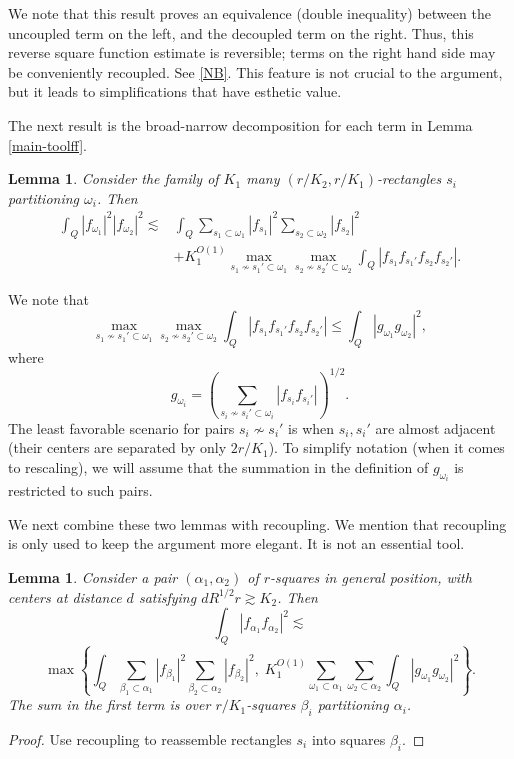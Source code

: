 \documentclass{amsart}%
\numberwithin{equation}{section}
\newtheorem{lemma}[theorem]{Lemma}
\newcommand{\1}{\mathbbm{1}}
\begin{document}
	We note that this result proves an equivalence (double inequality) between the  uncoupled term on the left, and the decoupled term on the right. Thus, this reverse square function estimate is reversible; terms on the right hand side  may be conveniently recoupled. See \eqref{NB}. This feature is not crucial to the argument, but it leads to simplifications that have esthetic value. 
	
	The next result is the broad-narrow decomposition for each term in Lemma \ref{main-toolff}.
	\begin{lemma}
		Consider the family of $K_1$ many  $(r/K_2,r/K_1)$-rectangles $s_i$ partitioning  $\omega_i$. Then 
		\begin{align*}
			\int_Q|f_{\omega_1}|^2|f_{\omega_2}|^2\lesssim &\int_Q\sum_{s_1\subset \omega_1}|f_{s_1}|^2\sum_{s_2\subset \omega_2}|f_{s_2}|^2\\&+K_1^{O(1)}\max_{s_1\not\sim s_1'\subset \omega_1}\max_{s_2\not\sim s_2'\subset \omega_2}\int_Q|f_{s_1}f_{s_1'}f_{s_2}f_{s_2'}|.
		\end{align*}
	\end{lemma}
	We note that 
	$$\max_{s_1\not\sim s_1'\subset \omega_1}\max_{s_2\not\sim s_2'\subset \omega_2}\int_Q|f_{s_1}f_{s_1'}f_{s_2}f_{s_2'}|\le \int_Q|g_{\omega_1}g_{\omega_2}|^2,$$
	where
    \begin{equation}
    \label{function-g}
        g_{\omega_i}=(\sum_{s_i\not\sim s_i'\subset \omega_i}|f_{s_i}f_{s_i'}|)^{1/2}.
    \end{equation}
The least favorable scenario for pairs $s_i\not\sim s_i'$ is when $s_i,s_i'$ are almost adjacent (their centers are separated by only $2r/K_1$). To simplify notation (when it comes to rescaling), we will assume that the summation in the definition of $g_{\omega_i}$ is restricted to such pairs. 
    
	We next combine  these two lemmas with recoupling. We mention that recoupling is only used to keep the argument more elegant. It is not an essential tool. 
	\begin{lemma}
	Consider a pair $(\alpha_1,\alpha_2)$ of $r$-squares  in general position, with centers at distance $d$ satisfying $dR^{1/2}r\gtrsim  K_2$. Then	$$\int_{Q}|f_{\alpha_1}f_{\alpha_2}|^2\lesssim$$	
		\begin{equation}
			\label{NB}
			\max\left\{\int_{Q}\sum_{\beta_1\subset \alpha_1}|f_{\beta_1}|^2\sum_{\beta_2\subset \alpha_2}|f_{\beta_2}|^2 ,\;K_1^{O(1)}\sum_{\omega_1\subset \alpha_1}\sum_{\omega_2\subset \alpha_2}\int_{Q}|g_{\omega_1}g_{\omega_2}|^2\right\}.\end{equation}
		The sum in the first term is over  $r/K_1$-squares $\beta_i$ partitioning $\alpha_i$.
	\end{lemma}
	\begin{proof}
	Use recoupling to reassemble rectangles $s_i$ into squares $\beta_i$. \qedhere
	
	\end{proof}
	
\end{document}
